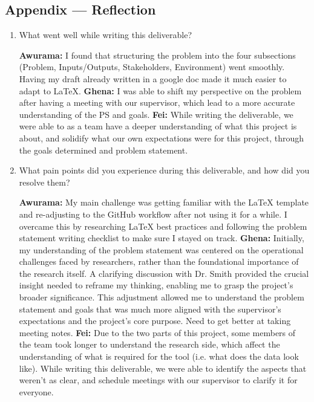 \documentclass{article}
\begin{document}
\begin{itemize}
\newpage{}

\section*{Appendix --- Reflection}


% 

\begin{enumerate}
    \item What went well while writing this deliverable? 
    
    \textbf{Awurama:} I found that structuring the problem into the four subsections 
    (Problem, Inputs/Outputs, Stakeholders, Environment) went smoothly. Having my 
    draft already written in a google doc made it much easier to adapt to LaTeX. 
    \textbf{Ghena:} I was able to shift my perspective on the problem after having a meeting with our supervisor, which lead to a more accurate understanding of the PS and goals.
    \textbf{Fei:} While writing the deliverable, we were able to as a team have a deeper understanding of what this project is about, and solidify what our own expectations were for this project, through the goals determined and problem statement.

    \item What pain points did you experience during this deliverable, and how
    did you resolve them?

    \textbf{Awurama:} My main challenge was getting familiar with the LaTeX template 
    and re-adjusting to the GitHub workflow after not using it for a while. I overcame this 
    by researching LaTeX best practices and following the problem statement writing checklist 
    to make sure I stayed on track.  
    \textbf{Ghena:} Initially, my understanding of the problem statement was centered on the operational challenges faced by researchers, rather than the foundational importance of the research itself. A clarifying discussion with Dr. Smith provided the crucial insight needed to reframe my thinking, enabling me to grasp the project's broader significance. This adjustment allowed me to understand the problem statement and goals that was much more aligned with the supervisor's expectations and the project's core purpose. Need to get better at taking meeting notes.
    \textbf{Fei:} Due to the two parts of this project, some members of the team took longer to understand the research side, which affect the understanding of what is required for the tool (i.e. what does the data look like). While writing this deliverable, we were able to identify the aspects that weren’t as clear, and schedule meetings with our supervisor to clarify it for everyone. 
    

\end{enumerate}
\end{itemize}
\end{document}
